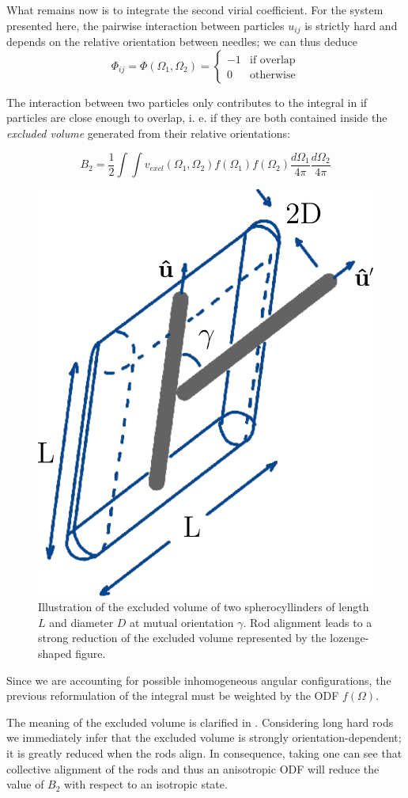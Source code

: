 What remains now is to integrate the second virial coefficient. For the system presented here, the pairwise interaction between particles $u_{ij}$ is strictly hard and depends on the relative orientation between needles; we can thus deduce
\begin{equation}
\Phi_{ij}=\Phi(\Omega_1,\Omega_2)=
\begin{cases}
-1 & \textrm{if overlap}\\
0 & \textrm{otherwise}
\end{cases}
\end{equation}

The interaction between two particles only contributes to the integral in  if particles are close enough to overlap, i. e. if they are both contained inside the {\em excluded volume} generated from their relative orientations:

\begin{equation}
B_2 = \frac{1}{2} \int \int v_{excl}(\Omega_1,\Omega_2) f(\Omega_1) f(\Omega_2)\frac{d\Omega_1}{4\pi}  \frac{d\Omega_2}{4\pi}
 \label{B2_exclv}
\end{equation}

\begin{figure}
\includegraphics[width= 0.4 \columnwidth]{figures/chapter-1/exclvol}
\caption{ \label{introfig3} Illustration of the excluded volume of two spherocyllinders  of length $L$ and diameter $D$ at mutual orientation $\gamma$. Rod alignment leads to a strong reduction of the excluded volume represented by the lozenge-shaped figure.}
\end{figure}

Since we are accounting for possible inhomogeneous angular configurations, the previous reformulation of the integral must be weighted by the ODF $f(\Omega)$.

The meaning of the excluded volume is clarified in . Considering long hard rods we immediately infer that the excluded volume is strongly orientation-dependent; it is greatly reduced when the rods align. In consequence, taking  one can see that collective alignment of the rods and thus an anisotropic ODF will reduce the value of $B_2$ with respect to an isotropic state.

